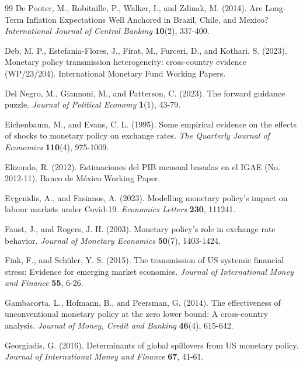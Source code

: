 \documentclass[12pt, reqno]{article}
\begin{document}
\begin{thebibliography}{99}
\bibitem{} \hypertarget{De Pooter et al. (2014)}{} 
De Pooter, M., Robitaille, P., Walker, I., and Zdinak, M. (2014). Are Long-Term Inflation Expectations Well Anchored in Brazil, Chile, and Mexico? \textit{International Journal of Central Banking} \textbf{10}(2), 337-400.

\bibitem{} \hypertarget{Deb et al. (2023)}{}Deb, M. P., Estefania-Flores, J., Firat, M., Furceri, D., and Kothari, S. (2023). Monetary policy transmission heterogeneity: cross-country evidence (WP/23/204). International Monetary Fund Working Papers.

\bibitem{} \hypertarget{Del Negro et al. (2023)}{} 
Del Negro, M., Giannoni, M., and Patterson, C. (2023). The forward guidance puzzle. \textit{Journal of Political Economy} \textbf{1}(1), 43-79.

\bibitem{} \hypertarget{Eichenbaum and Evans (1995)}{} 
Eichenbaum, M., and Evans, C. L. (1995). Some empirical evidence on the effects of shocks to monetary policy on exchange rates. \textit{The Quarterly Journal of Economics} \textbf{110}(4), 975-1009.


\bibitem{} \hypertarget{Elizondo (2012)}{}Elizondo, R. (2012). Estimaciones del PIB mensual basadas en el IGAE (No. 2012-11). Banco de México Working Paper.



\bibitem{} \hypertarget{Evgenidis and Fasianos (2023)}{} Evgenidis, A., and Fasianos, A. (2023). Modelling monetary policy’s impact on labour markets under Covid-19. \textit{Economics Letters} \textbf{230}, 111241.


\bibitem{} \hypertarget{Faust and Rogers (2003)}{} Faust, J., and Rogers, J. H. (2003). Monetary policy's role in exchange rate behavior. \textit{Journal of Monetary Economics} \textbf{50}(7), 1403-1424.


\bibitem{} \hypertarget{Fink (2015)}{} Fink, F., and Schüler, Y. S. (2015). The transmission of US systemic financial stress: Evidence for emerging market economies. \textit{Journal of International Money and Finance} \textbf{55}, 6-26.

\bibitem{} \hypertarget{Gambacorta et al. (2014)}{}
Gambacorta, L., Hofmann, B., and Peersman, G. (2014). The effectiveness of unconventional monetary policy at the zero lower bound: A cross‐country analysis. \textit{Journal of Money, Credit and Banking} \textbf{46}(4), 615-642.

\bibitem{} \hypertarget{Georgiadis (2016)}{} Georgiadis, G. (2016). Determinants of global spillovers from US monetary policy. \textit{Journal of International Money and Finance} \textbf{67}, 41-61.


\end{thebibliography}
\end{document}
